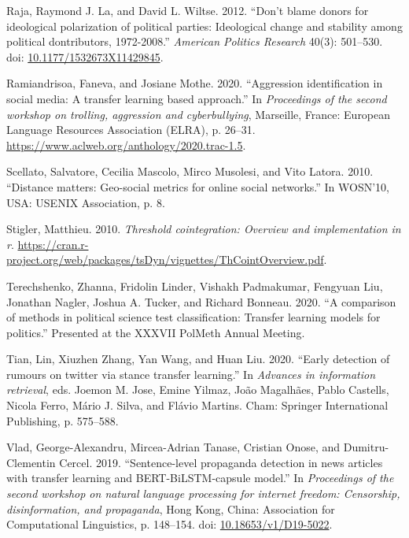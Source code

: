 \documentclass[12pt,]{article}
\newlength{\cslhangindent}
\newenvironment{CSLReferences}[2]%
    {\setlength{\parindent}{0pt}%
    \everypar{\setlength{\hangindent}{\cslhangindent}}\ignorespaces}%
    {\par}
\begin{document}
\begin{CSLReferences}{1}{0}
\leavevmode{}%
Raja, Raymond J. La, and David L. Wiltse. 2012. {``Don't blame donors
for ideological polarization of political parties: Ideological change
and stability among political dontributors, 1972-2008.''} \emph{American
Politics Research} 40(3): 501--530. doi:
\href{https://doi.org/10.1177/1532673X11429845}{10.1177/1532673X11429845}.

\leavevmode{}%
Ramiandrisoa, Faneva, and Josiane Mothe. 2020. {``Aggression
identification in social media: A transfer learning based approach.''}
In \emph{Proceedings of the second workshop on trolling, aggression and
cyberbullying}, Marseille, France: European Language Resources
Association (ELRA), p. 26--31.
\url{https://www.aclweb.org/anthology/2020.trac-1.5}.

\leavevmode{}%
Scellato, Salvatore, Cecilia Mascolo, Mirco Musolesi, and Vito Latora.
2010. {``Distance matters: Geo-social metrics for online social
networks.''} In WOSN'10, USA: USENIX Association, p. 8.

\leavevmode{}%
Stigler, Matthieu. 2010. \emph{Threshold cointegration: Overview and
implementation in r}.
\url{https://cran.r-project.org/web/packages/tsDyn/vignettes/ThCointOverview.pdf}.

\leavevmode{}%
Terechshenko, Zhanna, Fridolin Linder, Vishakh Padmakumar, Fengyuan Liu,
Jonathan Nagler, Joshua A. Tucker, and Richard Bonneau. 2020. {``A
comparison of methods in political science test classification: Transfer
learning models for politics.''} Presented at the XXXVII PolMeth Annual
Meeting.

\leavevmode{}%
Tian, Lin, Xiuzhen Zhang, Yan Wang, and Huan Liu. 2020. {``Early
detection of rumours on twitter via stance transfer learning.''} In
\emph{Advances in information retrieval}, eds. Joemon M. Jose, Emine
Yilmaz, João Magalhães, Pablo Castells, Nicola Ferro, Mário J. Silva,
and Flávio Martins. Cham: Springer International Publishing, p.
575--588.

\leavevmode{}%
Vlad, George-Alexandru, Mircea-Adrian Tanase, Cristian Onose, and
Dumitru-Clementin Cercel. 2019. {``Sentence-level propaganda detection
in news articles with transfer learning and {BERT}-{B}i{LSTM}-capsule
model.''} In \emph{Proceedings of the second workshop on natural
language processing for internet freedom: Censorship, disinformation,
and propaganda}, Hong Kong, China: Association for Computational
Linguistics, p. 148--154. doi:
\href{https://doi.org/10.18653/v1/D19-5022}{10.18653/v1/D19-5022}.


\end{CSLReferences}
\end{document}
